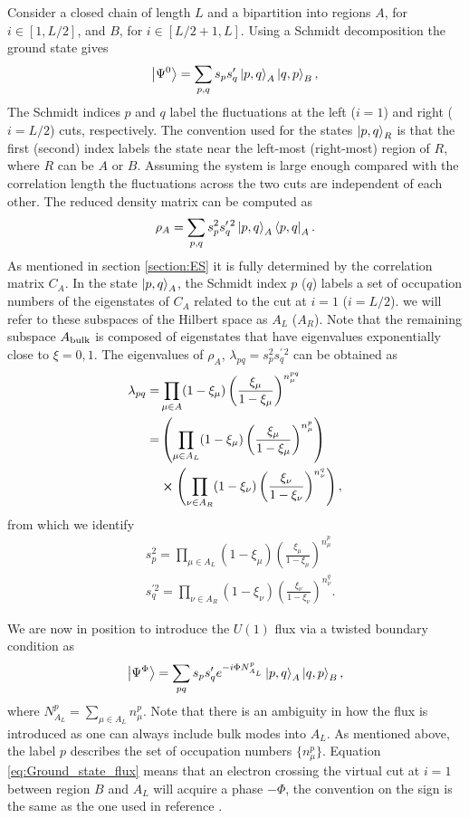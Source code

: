 \documentclass[twocolumn,amsmath,longbibliography,amssymb,superscriptaddress]{revtex4-1}
\begin{document}
Consider a closed chain of length $L$ and a bipartition into regions $A$, for $i\in [1,L/2]$, and $B$, for $i \in [L/2+1,L]$. Using a Schmidt decomposition the ground state gives
\begin{equation}
\ket{\Psi^0} = \sum_{p,q} s_p s'_q \ket{p,q}_A \ket{q,p}_B,
\end{equation}
The Schmidt indices $p$ and $q$ label the fluctuations at the left ($i=1$) and right ($i=L/2$) cuts, respectively. The convention used for the states $\ket{p,q}_{R}$ is that the first (second) index labels the state near the left-most (right-most) region of $R$, where $R$ can be $A$ or $B$. Assuming the system is large enough compared with the correlation length the fluctuations across the two cuts are independent of each other. The reduced density matrix can be computed as
\begin{equation}
\rho_A = \sum_{p,q} s_p^2 s^{\prime \, 2}_q \ket{p,q}_{A}\bra{p,q}_A .
\end{equation}
As mentioned in section \ref{section:ES} it is fully determined by the correlation matrix $C_A$. In the state $\ket{p,q}_A$, the Schmidt index $p$ ($q$) labels a set of occupation numbers of the eigenstates of $C_A$ related to the cut at $i=1$ ($i=L/2$). we will refer to these subspaces of the Hilbert space as $A_L$ ($A_R$). Note that the remaining subspace $A_{\rm bulk}$ is composed of eigenstates that have eigenvalues exponentially close to $\xi = 0,1$. The eigenvalues of $\rho_A$, $\lambda_{pq}=s_p^2 s_q^{\prime \, 2}$ can be obtained as \cite{Alexandrinata2011}
\begin{align}
\lambda_{pq} =& \prod_{\mu \in A} (1-\xi_\mu)\left(\frac{\xi_\mu}{1-\xi_\mu}\right)^{n_\mu^{pq}} \\
=&\left(\prod_{\mu\in A_L} (1-\xi_\mu)\left(\frac{\xi_\mu}{1-\xi_\mu}\right)^{n_\mu^{p}} \right) \\
&\cross \left(\prod_{\nu \in A_R} (1-\xi_\nu)\left(\frac{\xi_\nu}{1-\xi_\nu}\right)^{n_\nu^{q}} \right) ,
\label{eq:Alexandrinata}
\end{align}
from which we identify 
\begin{align*}
&s_p^2 = \prod_{\mu\in A_L} (1-\xi_\mu)\left(\frac{\xi_\mu}{1-\xi_\mu}\right)^{n_\mu^{p}} \\
&s_q^{\prime 2} = \prod_{\nu \in A_R} (1-\xi_\nu)\left(\frac{\xi_\nu}{1-\xi_\nu}\right)^{n_\nu^{q}}.
\label{eq:spsq_A}
\end{align*}

We are now in position to introduce the $U(1)$ flux via a twisted boundary condition as
\begin{equation}
\ket{\Psi^\Phi} = \sum_{pq} s_p s_q' e^{-i\Phi N_{A_L}^p} \ket{p,q}_A \ket{q,p}_B,
\label{eq:Ground_state_flux}
\end{equation}
where $N_{A_L}^p = \sum_{\mu \in A_L}n_\mu^p$. Note that there is an ambiguity in how the flux is introduced as one can always include bulk modes into $A_L$. As mentioned above, the label $p$ describes the set of occupation numbers $\{n_\mu^p\}$. Equation \eqref{eq:Ground_state_flux} means that an electron crossing the virtual cut at $i=1$ between region $B$ and $A_L$ will acquire a phase $-\Phi$, the convention on the sign is the same as the one used in reference \cite{Watanabe2018}. 
\end{document}
